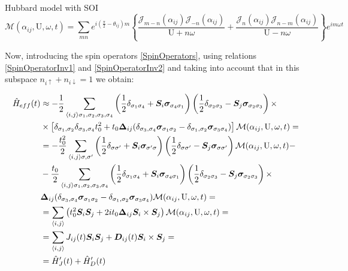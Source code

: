 \begin{section}{Hubbard model with SOI}
\begin{equation}
\mathcal{M}(\alpha_{ij}, \text{U}, \omega, t) = \sum_{mn}e^{i(\frac{\pi}{2}-\theta_{ij})m} \left\{ 
    \frac{\mathcal{J}_{m-n}(\alpha_{ij})\mathcal{J}_{-n}(\alpha_{ij})}{\text{U}+n\omega} +
    \frac{\mathcal{J}_n(\alpha_{ij})\mathcal{J}_{n-m}(\alpha_{ij})}{\text{U}-n\omega}    
    \right\}e^{im\omega t}
\end{equation}

Now, introducing the spin operators \ref{SpinOperators}, using relations \ref{SpinOperatorInv1} and \ref{SpinOperatorInv2} and taking into account that in this subspace $n_{i\uparrow}+n_{i\downarrow}=1$ we obtain:

\begin{align*}
\hat{H}_{eff}(t) &\approx -\frac{1}{2}\sum_{\langle i,j \rangle \sigma_1, \sigma_2, \sigma_3, \sigma_4} \left(\frac{1}{2}\delta_{\sigma_1 \sigma_4} + \boldsymbol{S}_i\boldsymbol{\sigma}_{\sigma_4 \sigma_1}\right)\left(\frac{1}{2}\delta_{\sigma_2 \sigma_3}-\boldsymbol{S}_j\boldsymbol{\sigma}_{\sigma_2 \sigma_3}\right) \times \\
&\times \left[ \delta_{\sigma_1, \sigma_2}\delta_{\sigma_3, \sigma_4}t_0^2+t_0\boldsymbol{\Delta}_{ij}(\delta_{\sigma_3,\sigma_4}\boldsymbol{\sigma}_{\sigma_1 \sigma_2}-\delta_{\sigma_1,\sigma_2}\boldsymbol{\sigma}_{\sigma_3 \sigma_4}) \right]\mathcal{M}(\alpha_{ij}, \text{U}, \omega, t) = \\
&= -\frac{t_0^2}{2} \sum_{\langle i,j \rangle \sigma, \sigma'} \left(\frac{1}{2}\delta_{\sigma \sigma'} + \boldsymbol{S}_i\boldsymbol{\sigma}_{\sigma' \sigma}\right)\left(\frac{1}{2}\delta_{\sigma \sigma'}-\boldsymbol{S}_j\boldsymbol{\sigma}_{\sigma \sigma'}\right)\mathcal{M}(\alpha_{ij}, \text{U}, \omega, t) - \\
&- \frac{t_0}{2} \sum_{\langle i,j \rangle \sigma_1, \sigma_2, \sigma_3, \sigma_4} \left(\frac{1}{2}\delta_{\sigma_1 \sigma_4} + \boldsymbol{S}_i\boldsymbol{\sigma}_{\sigma_4 \sigma_1}\right)\left(\frac{1}{2}\delta_{\sigma_2 \sigma_3}-\boldsymbol{S}_j\boldsymbol{\sigma}_{\sigma_2 \sigma_3}\right) \times \\
&\boldsymbol{\Delta}_{ij}(\delta_{\sigma_3,\sigma_4}\boldsymbol{\sigma}_{\sigma_1 \sigma_2}-\delta_{\sigma_1,\sigma_2}\boldsymbol{\sigma}_{\sigma_3 \sigma_4})\mathcal{M}(\alpha_{ij}, \text{U}, \omega, t) = \\
&= \sum_{\langle i,j \rangle} \left( t_0^2 \boldsymbol{S}_i\boldsymbol{S}_j + 2it_0\boldsymbol{\Delta}_{ij} \boldsymbol{S}_i \times \boldsymbol{S}_j \right) \mathcal{M}(\alpha_{ij}, \text{U}, \omega, t) =\\
&= \sum_{\langle i,j \rangle} J_{ij}(t)\boldsymbol{S}_i\boldsymbol{S}_j +\boldsymbol{D}_{ij}(t)\boldsymbol{S}_i \times \boldsymbol{S}_j = \\
&= \hat{H}_J'(t)+\hat{H}_D'(t)
\end{align*}


\end{section}
